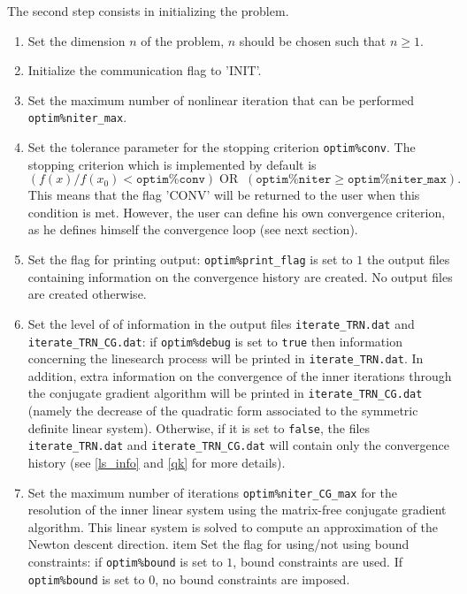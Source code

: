 \documentclass[a4paper,twoside,final,onecolumn,11pt,openright]{article}
\begin{document}
The second step consists in initializing the problem.
\begin{enumerate}
 \item Set the dimension $n$ of the problem, $n$ should be chosen such that $n\geq1$.
 \item Initialize the communication flag to 'INIT'.
 \item Set the maximum number of nonlinear iteration that can be performed \texttt{optim\%niter\_max}.
 \item Set the tolerance parameter for the stopping criterion \texttt{optim\%conv}. The stopping criterion which is implemented by default is 
\begin{equation}
 \left(f(x)/f(x_0)< \texttt{optim\%conv}\right) \; \textrm{OR} \;\;  \left(\texttt{optim\%niter}\geq\texttt{optim\%niter\_max}\right).
\end{equation}
This means that the flag 'CONV' will be returned to the user when this condition is met. However, the user can define his own convergence criterion, as he defines himself the convergence loop (see next section). 
\item  Set the flag for printing output: \texttt{optim\%print\_flag} is set to $1$ the output files containing information on the convergence history are created. No output files are created otherwise.
 \item Set the level of of information in the output files \texttt{iterate\_TRN.dat} and \texttt{iterate\_TRN\_CG.dat}: if \texttt{optim\%debug} is set to \texttt{true} then information concerning the linesearch process will be printed in \texttt{iterate\_TRN.dat}. In addition, extra information on the convergence of the inner iterations through the conjugate gradient algorithm will be printed in \texttt{iterate\_TRN\_CG.dat} (namely the decrease of the quadratic form associated to the symmetric definite linear system). Otherwise, if it is set to \texttt{false}, the files \texttt{iterate\_TRN.dat} and \texttt{iterate\_TRN\_CG.dat} will contain only the convergence history (see \ref{ls_info} and \ref{qk} for more details).
\item Set the maximum number of iterations \texttt{optim\%niter\_CG\_max} for the resolution of the inner linear system using the matrix-free conjugate gradient algorithm. This linear system is solved to compute an approximation of the Newton descent direction. 
item Set the flag for using/not using bound constraints: if \texttt{optim\%bound} is set to $1$, bound constraints are used. If  \texttt{optim\%bound} is set to $0$, no bound constraints are imposed.

\end{enumerate}
\end{document}
